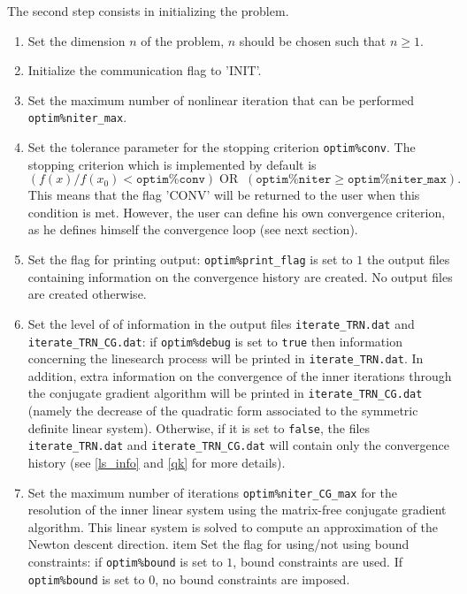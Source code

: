 \documentclass[a4paper,twoside,final,onecolumn,11pt,openright]{article}
\begin{document}
The second step consists in initializing the problem.
\begin{enumerate}
 \item Set the dimension $n$ of the problem, $n$ should be chosen such that $n\geq1$.
 \item Initialize the communication flag to 'INIT'.
 \item Set the maximum number of nonlinear iteration that can be performed \texttt{optim\%niter\_max}.
 \item Set the tolerance parameter for the stopping criterion \texttt{optim\%conv}. The stopping criterion which is implemented by default is 
\begin{equation}
 \left(f(x)/f(x_0)< \texttt{optim\%conv}\right) \; \textrm{OR} \;\;  \left(\texttt{optim\%niter}\geq\texttt{optim\%niter\_max}\right).
\end{equation}
This means that the flag 'CONV' will be returned to the user when this condition is met. However, the user can define his own convergence criterion, as he defines himself the convergence loop (see next section). 
\item  Set the flag for printing output: \texttt{optim\%print\_flag} is set to $1$ the output files containing information on the convergence history are created. No output files are created otherwise.
 \item Set the level of of information in the output files \texttt{iterate\_TRN.dat} and \texttt{iterate\_TRN\_CG.dat}: if \texttt{optim\%debug} is set to \texttt{true} then information concerning the linesearch process will be printed in \texttt{iterate\_TRN.dat}. In addition, extra information on the convergence of the inner iterations through the conjugate gradient algorithm will be printed in \texttt{iterate\_TRN\_CG.dat} (namely the decrease of the quadratic form associated to the symmetric definite linear system). Otherwise, if it is set to \texttt{false}, the files \texttt{iterate\_TRN.dat} and \texttt{iterate\_TRN\_CG.dat} will contain only the convergence history (see \ref{ls_info} and \ref{qk} for more details).
\item Set the maximum number of iterations \texttt{optim\%niter\_CG\_max} for the resolution of the inner linear system using the matrix-free conjugate gradient algorithm. This linear system is solved to compute an approximation of the Newton descent direction. 
item Set the flag for using/not using bound constraints: if \texttt{optim\%bound} is set to $1$, bound constraints are used. If  \texttt{optim\%bound} is set to $0$, no bound constraints are imposed.

\end{enumerate}
\end{document}
